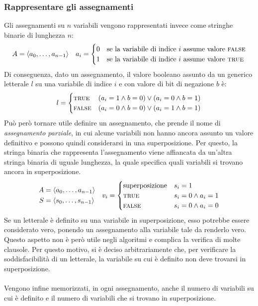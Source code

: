 \subsubsection{Rappresentare gli assegnamenti}
Gli assegnamenti su $n$ variabili vengono rappresentati invece come stringhe 
binarie di lunghezza $n$:
\[
    A = \langle a_0, \ldots, a_{n-1}\rangle \quad
    a_i = \begin{cases}
        0 & \textnormal{se la variabile di indice } i \textnormal{ assume valore } \textsc{false}\\
        1 & \textnormal{se la variabile di indice } i \textnormal{ assume valore } \textsc{true}
    \end{cases}
\]
Di conseguenza, dato un assegnamento, il valore booleano assunto da un 
generico letterale $l$ su una variabile di indice $i$ e con valore di bit di negazione $b$ è:
\begin{equation*}
    l = \begin{cases}
        \textsc{true} & (a_i = 1 \land b = 0) \lor (a_i = 0 \land b = 1) \\
        \textsc{false} & (a_i = 0 \land b = 0) \lor (a_i = 1 \land b = 1)
    \end{cases}
\end{equation*}
Può però tornare utile definire un assegnamento, che prende il nome di 
\textit{assegnamento parziale}, in cui 
alcune variabili non hanno ancora assunto un valore definitivo e possono
quindi considerarsi in una superposizione.
Per questo, la stringa binaria che rappresenta l'assegnamento viene affiancata da un'altra stringa
binaria di uguale lunghezza, la quale specifica quali variabili si trovano ancora in superposizione.
\[
    \begin{aligned}
        A &= \langle a_0, \ldots, a_{n-1}\rangle\\
        S &= \langle s_0, \ldots, s_{n-1}\rangle
    \end{aligned} \quad
    v_i = \begin{cases}
        \textnormal{superposizione} & s_i = 1 \\
        \textsc{true} & s_i = 0 \land a_i = 1 \\
        \textsc{false} & s_i = 0 \land a_i = 0
    \end{cases}
\]
Se un letterale è definito su una variabile in superposizione, esso potrebbe
essere considerato vero, ponendo un assegnamento alla variabile tale da renderlo vero.
Questo aspetto non è però utile negli algoritmi e complica la verifica di
molte clausole.
Per questo motivo, si è deciso arbitrariamente che, per verificare la soddisfacibilità di un letterale,
la variabile su cui è definito non deve trovarsi in superposizione.\\
\\
Vengono infine memorizzati, in ogni assegnamento, anche il numero di variabili su cui è definito
e il numero di variabili che si trovano in superposizione.


